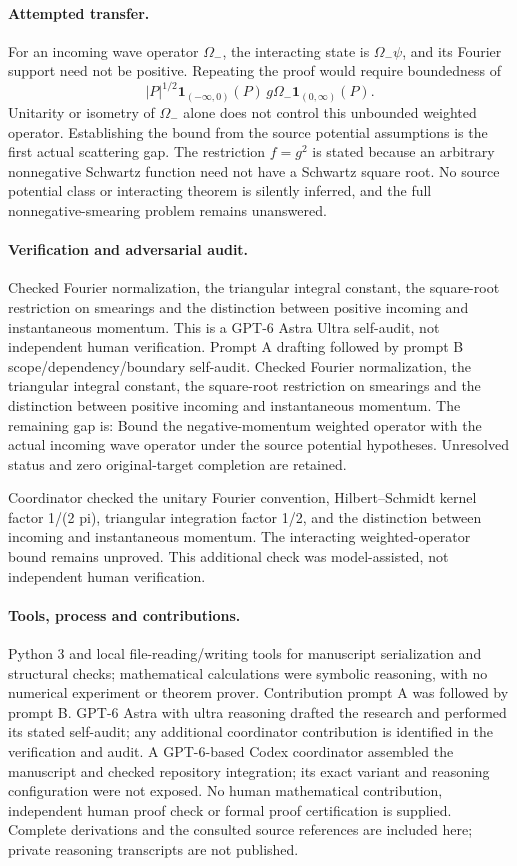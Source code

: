 \documentclass[11pt]{article}
\begin{document}
\paragraph{Attempted transfer.} For an incoming wave operator \(\Omega_-\), the interacting state is \(\Omega_-\psi\), and its Fourier support need not be positive. Repeating the proof would require boundedness of
\[
 |P|^{1/2}\mathbf1_{(-\infty,0)}(P)\,g\Omega_-\mathbf1_{(0,\infty)}(P).
\]
Unitarity or isometry of \(\Omega_-\) alone does not control this unbounded weighted operator. Establishing the bound from the source potential assumptions is the first actual scattering gap. The restriction \(f=g^2\) is stated because an arbitrary nonnegative Schwartz function need not have a Schwartz square root. No source potential class or interacting theorem is silently inferred, and the full nonnegative-smearing problem remains unanswered.

\paragraph{Verification and adversarial audit.}
Checked Fourier normalization, the triangular integral constant, the square-root restriction on smearings and the distinction between positive incoming and instantaneous momentum. This is a GPT-6 Astra Ultra self-audit, not independent human verification. Prompt A drafting followed by prompt B scope/dependency/boundary self-audit. Checked Fourier normalization, the triangular integral constant, the square-root restriction on smearings and the distinction between positive incoming and instantaneous momentum. The remaining gap is: Bound the negative-momentum weighted operator with the actual incoming wave operator under the source potential hypotheses. Unresolved status and zero original-target completion are retained.

Coordinator checked the unitary Fourier convention, Hilbert--Schmidt kernel factor 1/(2 pi), triangular integration factor 1/2, and the distinction between incoming and instantaneous momentum. The interacting weighted-operator bound remains unproved. This additional check was model-assisted, not independent human verification.

\paragraph{Tools, process and contributions.}
Python 3 and local file-reading/writing tools for manuscript serialization and structural checks; mathematical calculations were symbolic reasoning, with no numerical experiment or theorem prover. Contribution prompt A was followed by prompt B. GPT-6 Astra with ultra reasoning drafted the research and performed its stated self-audit; any additional coordinator contribution is identified in the verification and audit. A GPT-6-based Codex coordinator assembled the manuscript and checked repository integration; its exact variant and reasoning configuration were not exposed. No human mathematical contribution, independent human proof check or formal proof certification is supplied. Complete derivations and the consulted source references are included here; private reasoning transcripts are not published.
\end{document}
